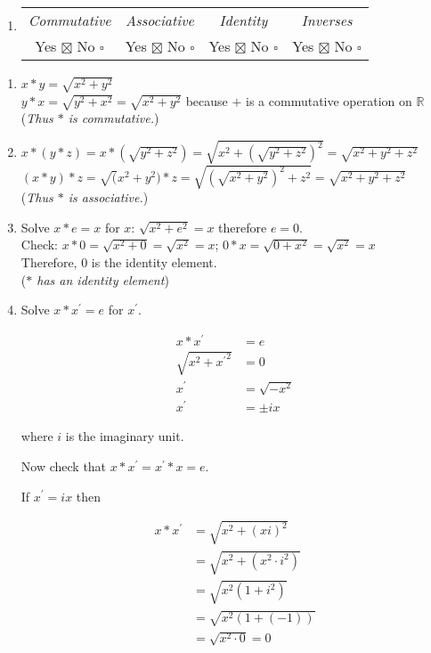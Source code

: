 \documentclass[12pt]{article}
\begin{document}
\begin{flushleft}
\begin{enumerate}
\item
\begin{tabular}{c c c c}
\textit{Commutative} & \textit{Associative} & \textit{Identity} & \textit{Inverses} \\
Yes $\boxtimes$ No $\square$ & Yes $\boxtimes$ No $\square$ & Yes $\boxtimes$ No $\square$ & Yes $\boxtimes$ No $\square$ \\
\end{tabular}
\end{enumerate}
\renewcommand{\theenumi}{(\roman{enumi})}
\begin{enumerate}
\item $x *y = \sqrt{x^2 + y^2}$ \\
 $ y *x = \sqrt{y^2 + x^2} = \sqrt{x^2 + y^2}$ because $+$ is a commutative operation on $\mathbb{R}$ \\
(\textit{Thus $*$ is commutative.})
\item $x * \left( y * z \right) = x *\left(\sqrt{y^2 + z^2} \right) = \sqrt{x^2 + \left(\sqrt{y^2 + z^2} \right)^2} = \sqrt{x^2 + y^2 + z^2}$ \\
$\left( x * y \right) * z = \sqrt( x^2 + y^2 ) * z = \sqrt{\left( \sqrt{x ^2 + y^2} \right)^2 + z^2} = \sqrt{x^2 + y^2 + z^2}$ \\
(\textit{Thus $*$ is associative.})
\item Solve $x*e= x$ for $x$: $\sqrt{x^2 + e^2} = x$ therefore $e = 0$. \\
Check: $x * 0 = \sqrt{x^2 + 0} = \sqrt{x^2} = x$; $0 *x = \sqrt{0 + x^2} = \sqrt{x^2} = x$ \\
Therefore, $0$ is the identity element. \\
(\textit{$*$ has an identity element})
\item Solve $x * x^{'} = e$ for $x^{'}$.

\begin{align*}
x * x^{'} &= e \\
\sqrt{x^2 + {x^{'}}^{2}} &= 0 \\
x^{'} &= \sqrt{-x^2} \\
x^{'} &= \pm ix
\end{align*}

where $i$ is the imaginary unit.

Now check that $x * x^{'} = x^{'} * x = e$. 

If $x^{'} = ix$ then 

\begin{align*}
x * x^{'} &= \sqrt{x^2 + (xi)^2} \\
&= \sqrt{x^2 + (x^2 \cdot i^2)} \\
&= \sqrt{x^2(1+i^2)} \\
&= \sqrt{x^2(1+(-1))} \\
&= \sqrt{x^2 \cdot 0} = 0
\end{align*}


\end{enumerate}
\end{flushleft}
\end{document}
